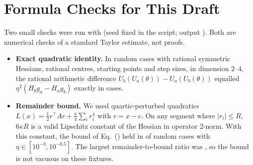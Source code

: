 \section{Formula Checks for This Draft}
\label{app:formula-check}
Two small checks were run with  (seed fixed in the script;
output ). Both are numerical checks of a standard Taylor
estimate, not proofs.
\begin{itemize}
\item \textbf{Exact quadratic identity.} In  random cases with rational
symmetric Hessians, rational centres, starting points and step sizes, in dimension $2$--$4$, the rational
arithmetic difference $U_b(U_a(\theta))-U_a(U_b(\theta))$ equalled $\eta^2(H_bg_a-H_ag_b)$ exactly in
 cases.
\item \textbf{Remainder bound.} We used quartic-perturbed quadratics
$L(x)=\tfrac12 r^\top A r+\tfrac{\kappa}{4}\sum_i r_i^4$ with $r=x-c$. On any segment where $|r_i|\le R$,
$6\kappa R$ is a valid Lipschitz constant of the Hessian in operator 2-norm. With this constant, the bound
of Eq.~() held in  of  random cases
with $\eta\in[10^{-3},10^{-0.5}]$. The largest remainder-to-bound ratio was , so the
bound is not vacuous on these fixtures.
\end{itemize}
